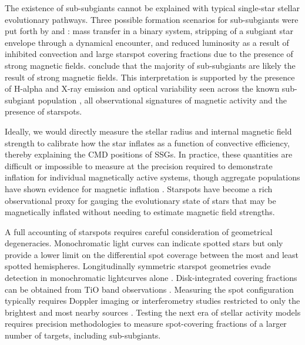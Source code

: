 \documentclass[trackchanges]{aastex631}
\begin{document}
The existence of sub-subgiants cannot be explained with typical single-star stellar evolutionary pathways. Three possible formation scenarios for sub-subgiants were put forth by \citet{geller17} and \citet{leiner17}: mass transfer in a binary system, stripping of a subgiant star envelope through a dynamical encounter, and reduced luminosity as a result of inhibited convection and large starspot covering fractions due to the presence of strong magnetic fields. \citet{leiner17} conclude that the majority of sub-subgiants are likely the result of strong magnetic fields. This interpretation is supported by the presence of H-alpha and X-ray emission and optical variability seen across the known sub-subgiant population \citep{geller17}, all observational signatures of magnetic activity and the presence of starspots.

Ideally, we would directly measure the stellar radius and internal magnetic field strength to calibrate how the star inflates as a function of convective efficiency, thereby explaining the CMD positions of SSGs.  In practice, these quantities are difficult or impossible to measure at the precision required to demonstrate inflation for individual magnetically active systems, though aggregate populations have shown evidence for magnetic inflation \citep{2018AJ....155..225K,2018MNRAS.476.3245J}. Starspots have become a rich observational proxy for gauging the evolutionary state of stars that may be magnetically inflated without needing to estimate magnetic field strengths.



A full accounting of starspots requires careful consideration of geometrical degeneracies.  Monochromatic light curves can indicate spotted stars \citep{2014ApJS..211...24M} but only provide a lower limit on the differential spot coverage between the most and least spotted hemispheres. Longitudinally symmetric starspot geometries evade detection in monochromatic lightcurves alone \citep{2019AJ....157...64L}. Disk-integrated covering fractions can be obtained from TiO band observations \citep{oneal96,fang2016,2019AJ....158..101M}. Measuring the spot configuration typically requires Doppler imaging or interferometry studies restricted to only the brightest and most nearby sources \citep{roettenbacher16}.  Testing the next era of stellar activity models requires precision methodologies to measure spot-covering fractions of a larger number of targets, including sub-subgiants.
\end{document}
